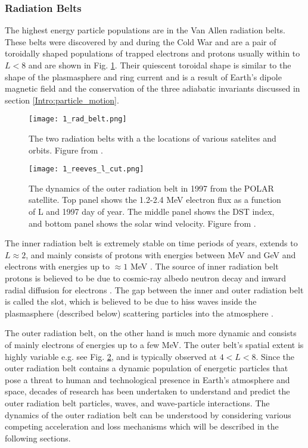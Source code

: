\subsubsection{Radiation Belts}\label{Intro:radiation_belt}
The highest energy particle populations are in the Van Allen radiation belts. These belts were discovered by \citet{Allen1959} and \citet{Vernov1960} during the Cold War and are a pair of toroidally shaped populations of trapped electrons and protons usually within to $L < 8$ and are shown in Fig. \ref{Intro:rad_belts}. Their quiescent toroidal shape is similar to the shape of the plasmasphere and ring current and is a result of Earth's dipole magnetic field and the conservation of the three adiabatic invariants discussed in section \ref{Intro:particle_motion}.

\begin{figure}
\texttt{[image: 1\_rad\_belt.png]}
\caption{The two radiation belts with a the locations of various satelites and orbits. Figure from \citep{Horne2013}.}
\label{Intro:rad_belts}
\end{figure}

\begin{figure}
\texttt{[image: 1\_reeves\_l\_cut.png]}
\caption{The dynamics of the outer radiation belt in 1997 from the POLAR satellite. Top panel shows the 1.2-2.4 MeV electron flux as a function of L and 1997 day of year. The middle panel shows the DST index, and bottom panel shows the solar wind velocity. Figure from \citep{Reeves2003}.}
\label{Intro:reeves_l_cut}
\end{figure}

The inner radiation belt is extremely stable on time periods of years, extends to $L \approx 2$, and mainly consists of protons with energies between MeV and GeV and electrons with energies up to $\approx 1$ MeV \citep{Claudepierre2019}. The source of inner radiation belt protons is believed to be due to cosmic-ray albedo neutron decay \citep[e.g.][]{Li2017_CRAND} and inward radial diffusion for electrons \citep[e.g.][]{O'Brien2016_inner}. The gap between the inner and outer radiation belt is called the slot, which is believed to be due to hiss waves inside the plasmasphere (described below) scattering particles into the atmosphere \citep[e.g.][]{Lyons1973, Breneman2015}.

The outer radiation belt, on the other hand is much more dynamic and consists of mainly electrons of energies up to a few MeV. The outer belt's spatial extent is highly variable e.g. see Fig. \ref{Intro:reeves_l_cut}, and is typically observed at $4 < L < 8$. Since the outer radiation belt contains a dynamic population of energetic particles that pose a threat to human and technological presence in Earth's atmosphere and space, decades of research has been undertaken to understand and predict the outer radiation belt particles, waves, and wave-particle interactions. The dynamics of the outer radiation belt can be understood by considering various competing acceleration and loss mechanisms which will be described in the following sections.

